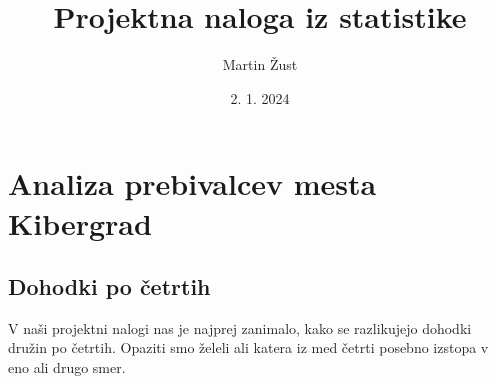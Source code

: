 \documentclass{article}
\title{Projektna naloga iz statistike}
\author{Martin Žust}
\date{2. 1. 2024}
\begin{document}
\section{Analiza prebivalcev mesta Kibergrad}

\subsection{Dohodki po četrtih}
V naši projektni nalogi nas je najprej zanimalo, kako se razlikujejo dohodki družin po četrtih. Opaziti smo želeli ali katera iz med četrti 
posebno izstopa v eno ali drugo smer. 
\end{document}
